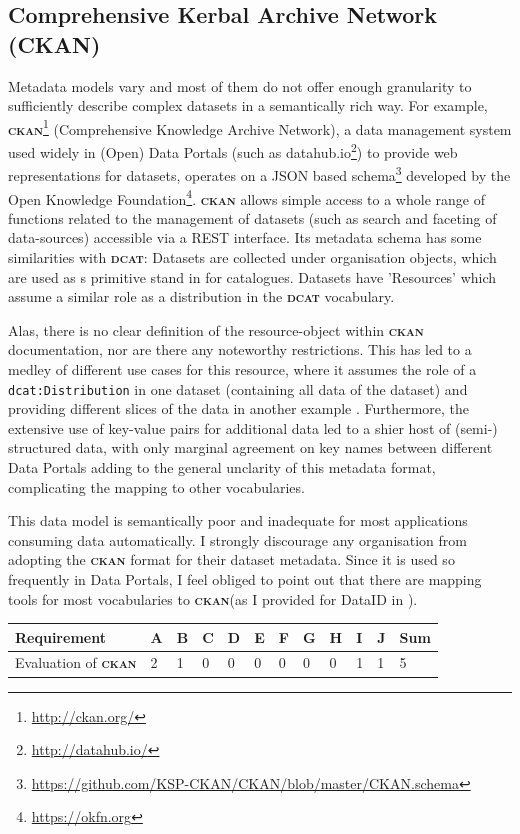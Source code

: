 \documentclass[a4paper,english,twoside,BCOR1.5cm,headsepline,DIV12,appendixprefix,final,12pt]{scrbook}
\newcommand{\ckan}{{\scshape\bfseries ckan}\xspace}
\newcommand{\dcat}{{\scshape\bfseries dcat}\xspace}
\newcommand{\prop}[1]{{{\texttt{#1}}}}
\newcommand\footnoteurl[1]{\footnote{\scriptsize\url{#1}}}
\begin{document}
\subsection{Comprehensive Kerbal Archive Network (CKAN)}
\label{sec:ckan}

Metadata models vary and most of them do not offer enough granularity to sufficiently describe complex datasets in a semantically rich way. 
For example, \ckan{}\footnoteurl{http://ckan.org/} (Comprehensive Knowledge Archive Network), a data management system used widely in (Open) Data Portals (such as datahub.io\footnoteurl{http://datahub.io/}) to provide web representations for datasets, operates on a JSON  based schema\footnoteurl{https://github.com/KSP-CKAN/CKAN/blob/master/CKAN.schema} developed by the Open Knowledge Foundation\footnoteurl{https://okfn.org}.
\ckan allows simple access to a whole range of functions related to the management of datasets (such as search and faceting of data-sources) accessible via a REST interface.
Its metadata schema has some similarities with \dcat: Datasets are collected under organisation objects, which are used as s primitive stand in for catalogues. Datasets have 'Resources' which assume a similar role as a distribution in the \dcat vocabulary. 

Alas, there is no clear definition of the resource-object within \ckan documentation, nor are there any noteworthy restrictions. This has led to a medley of different use cases for this resource, where it assumes the role of a \prop{dcat:Distribution} in one dataset (containing all data of the dataset) and providing different slices of the data in another example \cite{neum-etal-2016w3c}. Furthermore, the extensive use of key-value pairs for additional data led to a shier host of (semi-) structured data, with only marginal agreement on key names between different Data Portals \cite{neum-etal-2016w3c} adding to the general unclarity of this metadata format, complicating the mapping to other vocabularies.

This data model is semantically poor and inadequate for most applications consuming data automatically. I strongly discourage any organisation from adopting the \ckan format for their dataset metadata. Since it is used so frequently in Data Portals, I feel obliged to point out that there are mapping tools for most vocabularies to \ckan (as I provided for DataID in \cite{dataID2014}).

\begin{table}[!htbp]
    \centering
    \begin{tabular}{|l|l|l|l|l|l|l|l|l|l|l|l|}
        \hline
        Requirement & A & B & C & D & E & F & G & H & I & J & Sum \\
        \hline
        Evaluation of \ckan & 2 & 1 & 0 & 0 & 0 & 0 & 0 & 0 & 1 & 1 & 5 \\
        \hline
    \end{tabular}
    \label{tab:evalckan}
\end{table}
\end{document}
